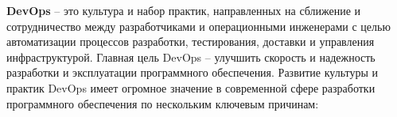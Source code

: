 \documentclass[referat]{SCWorks}
\begin{document}

\date{2023}

\maketitle


\tableofcontents




\intro

\textbf{DevOps} -- это культура и набор практик, направленных на сближение и сотрудничество между разработчиками и операционными инженерами с целью автоматизации процессов разработки, тестирования, доставки и управления инфраструктурой. Главная цель DevOps -- улучшить скорость и надежность разработки и эксплуатации программного обеспечения. Развитие культуры и практик DevOps имеет огромное значение в современной сфере разработки программного обеспечения по нескольким ключевым причинам:
\end{document}
